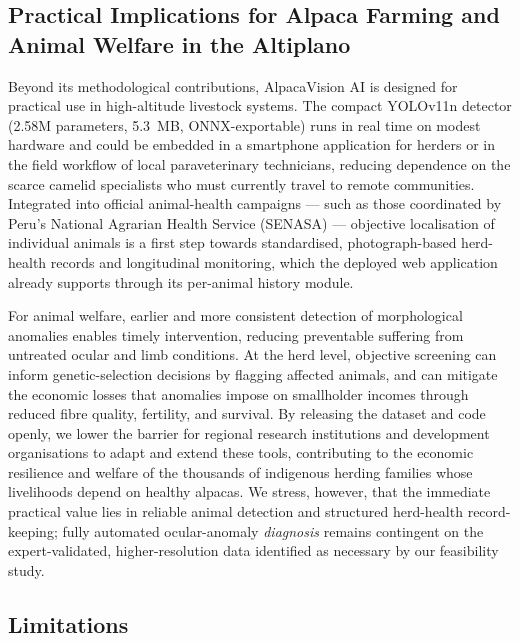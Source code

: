 \documentclass[journal=animals,article=article,submit=mdpi,moreauthors=true,pdftex]{mdpi}
\begin{document}
\subsection{Practical Implications for Alpaca Farming and Animal Welfare in the Altiplano}

Beyond its methodological contributions, AlpacaVision AI is designed for practical use in
high-altitude livestock systems. The compact YOLOv11n detector (2.58M parameters, 5.3~MB,
ONNX-exportable) runs in real time on modest hardware and could be embedded in a
smartphone application for herders or in the field workflow of local paraveterinary
technicians, reducing dependence on the scarce camelid specialists who must currently
travel to remote communities. Integrated into official animal-health campaigns --- such as
those coordinated by Peru's National Agrarian Health Service (SENASA) --- objective
localisation of individual animals is a first step towards standardised, photograph-based
herd-health records and longitudinal monitoring, which the deployed web application
already supports through its per-animal history module.

For animal welfare, earlier and more consistent detection of morphological anomalies
enables timely intervention, reducing preventable suffering from untreated ocular and limb
conditions. At the herd level, objective screening can inform genetic-selection decisions
by flagging affected animals, and can mitigate the economic losses that anomalies impose on
smallholder incomes through reduced fibre quality, fertility, and survival. By releasing
the dataset and code openly, we lower the barrier for regional research institutions and
development organisations to adapt and extend these tools, contributing to the economic
resilience and welfare of the thousands of indigenous herding families whose livelihoods
depend on healthy alpacas. We stress, however, that the immediate practical value lies in
reliable animal detection and structured herd-health record-keeping; fully automated
ocular-anomaly \emph{diagnosis} remains contingent on the expert-validated, higher-resolution
data identified as necessary by our feasibility study.

\subsection{Limitations}
\end{document}
